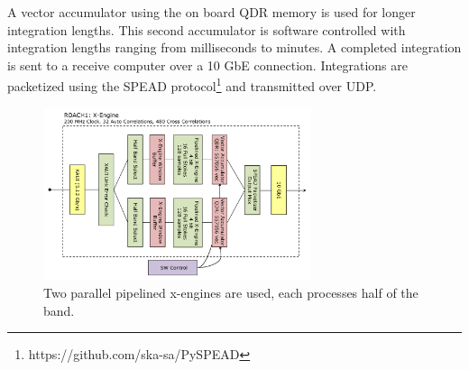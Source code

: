 \documentclass[useAMS,macros,usenatbib]{mn2e}
\begin{document}
A vector accumulator using the on board QDR memory is used for longer integration lengths.
This second accumulator is software controlled with integration lengths ranging from milliseconds to minutes.
A completed integration is sent to a receive computer over a 10 GbE connection.
Integrations are packetized using the SPEAD protocol\footnote{https://github.com/ska-sa/PySPEAD} and transmitted over UDP.


\begin{figure}
    \centering
    \includegraphics[width=0.7\textwidth]{graphics/crop_xengine_block.pdf}
    \caption{Two parallel pipelined x-engines are used, each processes half of the band.}
    \label{fig:xeng_block}
\end{figure}
\end{document}
